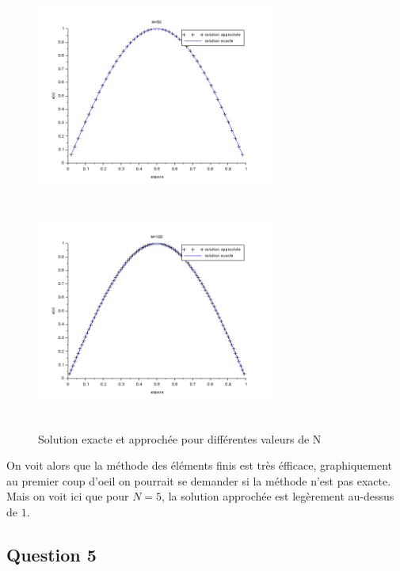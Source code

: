 \documentclass[a4paper,12pt]{article}
\begin{document}
\begin{figure}[h!]
\begin{center}
  \includegraphics[width=225pt,height=200pt]{image/figure_7}
  \includegraphics[width=225pt,height=200pt]{image/figure_8}
\end{center}
\caption{Solution exacte et approch\'ee pour diff\'erentes valeurs de N}
\label{Solution exacte et approch\'ee pour diff\'erentes valeurs de N}
\end{figure}

On voit alors que la m\'ethode des \'el\'ements finis est tr\`es \'efficace, graphiquement au premier coup d'oeil on pourrait se demander si la m\'ethode n'est pas exacte. Mais on voit ici que pour $N=5$, la solution approch\'ee est leg\`erement au-dessus de $1$.

\subsection{Question 5}
\end{document}
